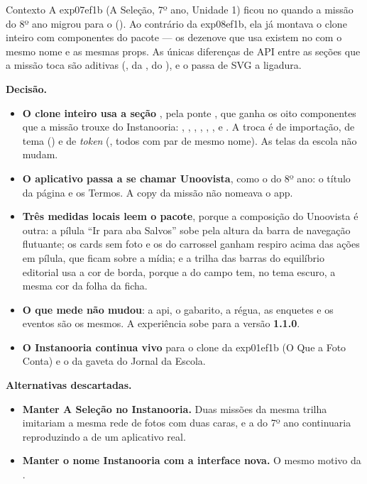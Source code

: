 \begin{especificacao}{Contexto}
A exp07ef1b (A Seleção, 7º ano, Unidade 1) ficou no  quando a
missão do 8º ano migrou para o  (). Ao contrário da
exp08ef1b, ela já montava o clone inteiro com componentes do pacote --- os
dezenove que usa existem no  com o mesmo nome e as mesmas props.
As únicas diferenças de API entre as seções que a missão toca são aditivas
(,  da ,  do
), e o  passa de SVG a ligadura.
\end{especificacao}

\textbf{Decisão.}

\begin{itemize}
  \item \textbf{O clone inteiro usa a seção }, pela ponte
    , que ganha os oito componentes que a missão
    trouxe do Instanooria: , ,
    , , , ,
     e . A troca é de importação, de tema
    () e de \emph{token} (, todos com par de
    mesmo nome). As telas da escola não mudam.
  \item \textbf{O aplicativo passa a se chamar Unoovista}, como o do 8º ano:
    o título da página e os Termos. A copy da missão não nomeava o app.
  \item \textbf{Três medidas locais leem o pacote}, porque a composição do
    Unoovista é outra: a pílula \enquote{Ir para aba Salvos} sobe pela altura
    da barra de navegação flutuante; os cards sem foto e os do carrossel
    ganham respiro acima das ações em pílula, que ficam sobre a mídia; e a
    trilha das barras do equilíbrio editorial usa a cor de borda, porque a do
    campo tem, no tema escuro, a mesma cor da folha da ficha.
  \item \textbf{O que mede não mudou}: a api, o gabarito, a régua, as enquetes
    e os eventos são os mesmos. A experiência sobe para a versão
    \textbf{1.1.0}.
  \item \textbf{O Instanooria continua vivo} para o clone da exp01ef1b (O Que
    a Foto Conta) e o  da gaveta do Jornal da Escola.
\end{itemize}

\textbf{Alternativas descartadas.}

\begin{itemize}
  \item \textbf{Manter A Seleção no Instanooria.} Duas missões da mesma
    trilha imitariam a mesma rede de fotos com duas caras, e a do 7º ano
    continuaria reproduzindo a de um aplicativo real.
  \item \textbf{Manter o nome Instanooria com a interface nova.} O mesmo
    motivo da .
\end{itemize}

